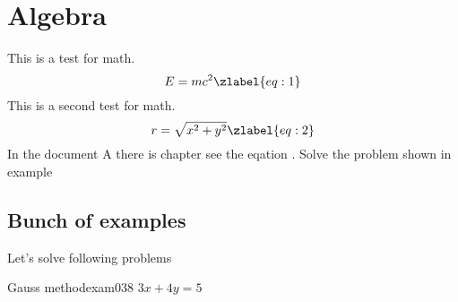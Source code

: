 \documentclass{scrbook}
\begin{document}
  \chapter{Algebra}
    This is a test for math.
    \begin{equation}
        E=mc^2 \zlabel{eq:1}
    \end{equation}
    This is a second test for math.
    \begin{equation}
        r = \sqrt{x^2 + y^2} \zlabel{eq:2}
    \end{equation}
    In the document A there is chapter  see the eqation . Solve the
    problem shown in example 
  
    \section{Bunch of examples}
      Let's solve following problems
      
      \begin{mathexam}{Gauss method}{exam038}
        \(3x + 4y = 5\)
      \end{mathexam}
\end{document}
